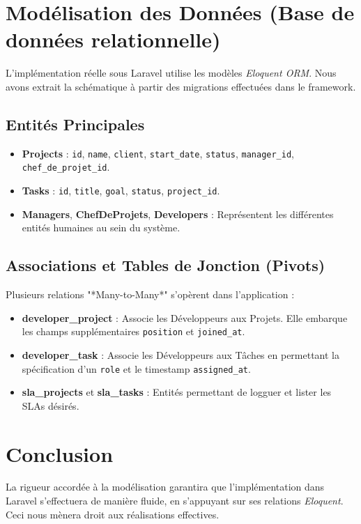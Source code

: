 \section{Mod\'{e}lisation des Donn\'{e}es (Base de donn\'{e}es relationnelle)}

L'impl\'{e}mentation r\'{e}elle sous Laravel utilise les mod\`{e}les \textit{Eloquent ORM}.
Nous avons extrait la sch\'{e}matique \`{a} partir des migrations effectu\'{e}es dans le framework.

\subsection{Entit\'{e}s Principales}
\begin{itemize}[leftmargin=*]
    \item \textbf{Projects} : \texttt{id}, \texttt{name}, \texttt{client}, \texttt{start\_date}, \texttt{status}, \texttt{manager\_id}, \texttt{chef\_de\_projet\_id}.
    \item \textbf{Tasks} : \texttt{id}, \texttt{title}, \texttt{goal}, \texttt{status}, \texttt{project\_id}.
    \item \textbf{Managers}, \textbf{ChefDeProjets}, \textbf{Developers} : Repr\'{e}sentent les diff\'{e}rentes
    entit\'{e}s humaines au sein du syst\`{e}me.
\end{itemize}

\subsection{Associations et Tables de Jonction (Pivots)}
Plusieurs relations "*Many-to-Many*" s'op\`{e}rent dans l'application :
\begin{itemize}[leftmargin=*]
    \item \textbf{developer\_project} : Associe les D\'{e}veloppeurs aux Projets. Elle embarque
    les champs suppl\'{e}mentaires \texttt{position} et \texttt{joined\_at}.
    \item \textbf{developer\_task} : Associe les D\'{e}veloppeurs aux T\^{a}ches en permettant
    la sp\'{e}cification d'un \texttt{role} et le timestamp \texttt{assigned\_at}.
    \item \textbf{sla\_projects} et \textbf{sla\_tasks} : Entit\'{e}s permettant de logguer et
    lister les SLAs d\'{e}sir\'{e}s.
\end{itemize}

\section{Conclusion}
La rigueur accord\'{e}e \`{a} la mod\'{e}lisation garantira que l'impl\'{e}mentation dans
Laravel s'effectuera de mani\`{e}re fluide, en s'appuyant sur ses relations \textit{Eloquent}.
Ceci nous m\`{e}nera droit aux r\'{e}alisations effectives.
